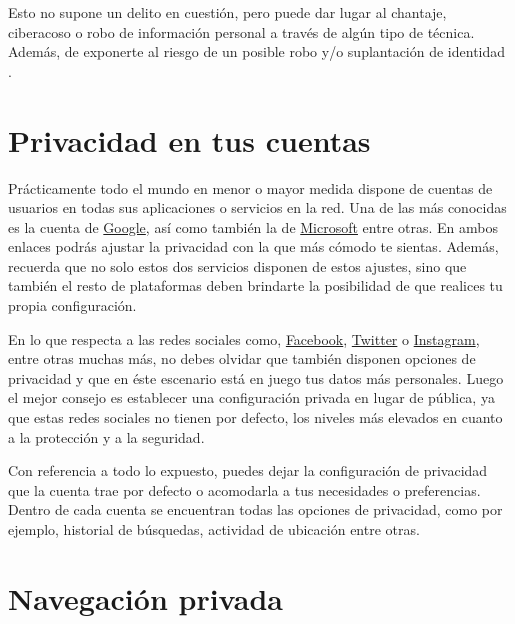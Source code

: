 \documentclass[
  spanish,
  a4paper,
  openany]{book}
\begin{document}
Esto no supone un delito en cuestión, pero puede dar lugar al chantaje, ciberacoso o robo de información personal a través de algún tipo de técnica. Además, de exponerte al riesgo de un posible robo y/o suplantación de identidad \citep{AEPD-oversharing}.

\hypertarget{privacidad-en-tus-cuentas}{%
\section{Privacidad en tus cuentas}\label{privacidad-en-tus-cuentas}}

Prácticamente todo el mundo en menor o mayor medida dispone de cuentas de usuarios en todas sus aplicaciones o servicios en la red. Una de las más conocidas es la cuenta de \href{https://myaccount.google.com/data-and-personalization}{Google}, así como también la de \href{https://account.microsoft.com/account/privacy}{Microsoft} entre otras. En ambos enlaces podrás ajustar la privacidad con la que más cómodo te sientas. Además, recuerda que no solo estos dos servicios disponen de estos ajustes, sino que también el resto de plataformas deben brindarte la posibilidad de que realices tu propia configuración.

En lo que respecta a las redes sociales como, \href{https://es-la.facebook.com/help/325807937506242}{Facebook}, \href{https://help.twitter.com/es/safety-and-security\#ads-and-data-privacy}{Twitter} o \href{https://es-es.facebook.com/help/instagram/196883487377501/?helpref=hc_fnav\&bc\%5B0\%5D=Ayuda\%20de\%20Instagram\&bc\%5B1\%5D=Administrar\%20tu\%20cuenta}{Instagram}, entre otras muchas más, no debes olvidar que también disponen opciones de privacidad y que en éste escenario está en juego tus datos más personales. Luego el mejor consejo es establecer una configuración privada en lugar de pública, ya que estas redes sociales no tienen por defecto, los niveles más elevados en cuanto a la protección y a la seguridad.

Con referencia a todo lo expuesto, puedes dejar la configuración de privacidad que la cuenta trae por defecto o acomodarla a tus necesidades o preferencias. Dentro de cada cuenta se encuentran todas las opciones de privacidad, como por ejemplo, historial de búsquedas, actividad de ubicación entre otras.

\hypertarget{navegaciuxf3n-privada}{%
\section{Navegación privada}\label{navegaciuxf3n-privada}}
\end{document}
